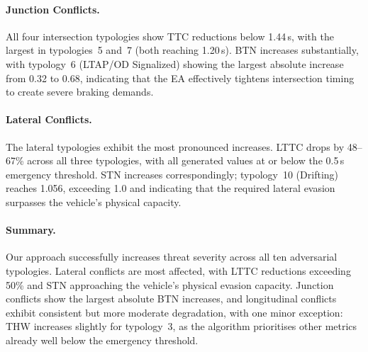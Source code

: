 \paragraph{Junction Conflicts.}
All four intersection typologies show TTC reductions below 1.44\,s, with the largest in typologies~5 and~7 (both reaching 1.20\,s). BTN increases substantially, with typology~6 (LTAP/OD Signalized) showing the largest absolute increase from 0.32 to 0.68, indicating that the EA effectively tightens intersection timing to create severe braking demands.

\paragraph{Lateral Conflicts.}
The lateral typologies exhibit the most pronounced increases. LTTC drops by 48--67\% across all three typologies, with all generated values at or below the 0.5\,s emergency threshold. STN increases correspondingly; typology~10 (Drifting) reaches 1.056, exceeding 1.0 and indicating that the required lateral evasion surpasses the vehicle's physical capacity.

\paragraph{Summary.}
Our approach successfully increases threat severity across all ten adversarial typologies. Lateral conflicts are most affected, with LTTC reductions exceeding 50\% and STN approaching the vehicle's physical evasion capacity. Junction conflicts show the largest absolute BTN increases, and longitudinal conflicts exhibit consistent but more moderate degradation, with one minor exception: THW increases slightly for typology~3, as the algorithm prioritises other metrics already well below the emergency threshold.



